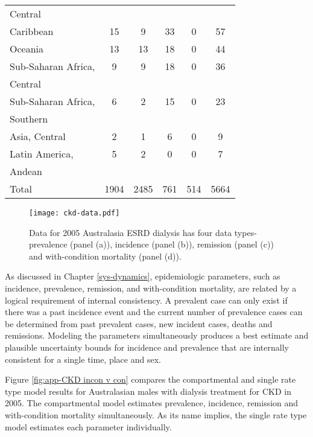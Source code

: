\begin{table}[h]
\begin{center}
\begin{tabular}{|l|c|c|c|c|c|}
                Central & & & & & \\
                Caribbean & 15 & 9 & 33 & 0 & 57 \\
                Oceania & 13 & 13 & 18 & 0 & 44 \\
                Sub-Saharan Africa, & 9 & 9 & 18 & 0 & 36 \\
                Central & & & & & \\
                Sub-Saharan Africa, & 6 & 2 & 15 & 0 & 23 \\
                Southern & & & & & \\
                Asia, Central & 2 & 1 & 6 & 0 & 9 \\
                Latin America, & 5 & 2 & 0 & 0 & 7 \\
                Andean & & & & & \\
                Total & 1904 & 2485 & 761 & 514 & 5664 \\
            \hline
        \end{tabular}
    \end{center}
\end{table}

    \begin{figure}[h]
        \begin{center}
            \texttt{[image: ckd-data.pdf]}
            \caption{Data for 2005 Australasia ESRD dialysis has four data types-prevalence (panel (a)), incidence (panel (b)), remission (panel (c)) and with-condition mortality (panel (d)).}
            \label{fig:app-CKD data}
        \end{center}
    \end{figure}

As discussed in Chapter \ref{sys-dynamics}, epidemiologic parameters, such as incidence, prevalence, remission, and with-condition mortality, are related by a logical requirement of internal consistency.  A prevalent case can only exist if there was a past incidence event and the current number of prevalence cases can be determined from past prevalent cases, new incident cases, deaths and remissions.  Modeling the parameters simultaneously produces a best estimate and plausible uncertainty bounds for incidence and prevalence that are internally consistent for a single time, place and sex.

Figure \ref{fig:app-CKD incon v con} compares the compartmental and single rate type model results for Australasian males with dialysis treatment for CKD in 2005.  The compartmental model estimates prevalence, incidence, remission and with-condition mortality simultaneously.  As its name implies, the single rate type model estimates each parameter individually.


